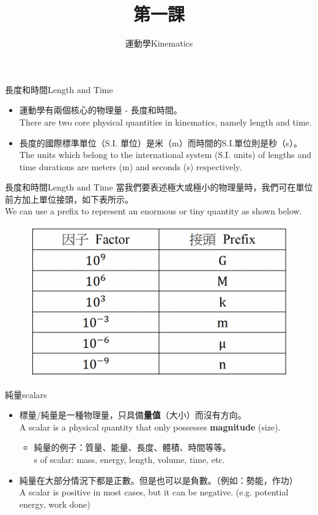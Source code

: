 \documentclass[beamer=true]{standalone}
\title{第一課}
\author{運動學Kinematics}
\institute{全年班}
\date{}
\begin{document}
\frame{\titlepage}

\begin{frame}{長度和時間Length and Time}
    \begin{itemize}
        \item 運動學有兩個核心的物理量 - 長度和時間。\\There are two core physical quantities in kinematics, namely length and time.
        \item 長度的國際標準單位（S.I. 單位）是米（m）而時間的S.I.單位則是秒（s）。\\The units which belong to the international system (S.I. units) of lengths and time durations are meters (m) and seconds (s) respectively.
    \end{itemize}
\end{frame}
\begin{frame}{長度和時間Length and Time}
    當我們要表述極大或極小的物理量時，我們可在單位前方加上單位接頭，如下表所示。\\We can use a prefix to represent an enormous or tiny quantity as shown below.
    \begin{figure}[h!]
        \centering
        \includegraphics[width=.5\textwidth]{../../assets/3d0d2672.png}
    \end{figure}
\end{frame}

\begin{frame}{純量scalars}
    \begin{itemize}
        \item 標量/純量是一種物理量，只具備\textbf{量值}（大小）而沒有方向。\\A scalar is a physical quantity that only possesses \textbf{magnitude} (size).
              \begin{itemize}
                  \item 純量的例子：質量、能量、長度、體積、時間等等。\\s of scalar: mass, energy, length, volume, time, etc.
              \end{itemize}
        \item 純量在大部分情況下都是正數。但是也可以是負數。（例如：勢能，作功）\\A scalar is positive in most cases, but it can be negative. (e.g. potential energy, work done)
    \end{itemize}
\end{frame}
\end{document}

